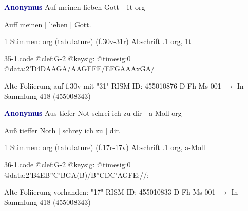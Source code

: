 \documentclass[twocolumn]{book}
\begin{document}
\newline \par \vspace{7pt} \textcolor{darkblue}{\textbf{Anonymus  }}
\newline Auf meinen lieben Gott - 1t
\newline org
\newline \begin{itshape}[f.30v, at left:] Auff meinen | lieben | Gott.\end{itshape} 
\newline \textcolor{darkblue}{}  1 Stimmen: org (tabulature)  (f.30v-31r)
\newline Abschrift
.1  org, 1t  
\begin{filecontents*}{35-1.code}
@clef:G-2
@keysig:
@timesig:0
@data:2'D4DAAGA/AAGFFE/EFGAAAxGA/
\end{filecontents*}
\newline
%
\newline Alte Foliierung auf f.30v mit "31"
\newline RISM-ID: 455010876
\newline D-Fh  Ms 001
\newline $\rightarrow$ In Sammlung 418 (455008343)
      
\newline \par \vspace{7pt} \textcolor{darkblue}{\textbf{Anonymus  }}
\newline Aus tiefer Not schrei ich zu dir - a-Moll
\newline org
\newline \begin{itshape}[f.17r, at left:] Auß tieffer Noth | schreÿ ich zu | dir.\end{itshape} 
\newline \textcolor{darkblue}{}  1 Stimmen: org (tabulature)  (f.17r-17v)
\newline Abschrift
.1  org, a-Moll  
\begin{filecontents*}{36-1.code}
@clef:G-2
@keysig:
@timesig:0
@data:2'B4EB''C'BGA(B)/B''CDC'AGFE://:
\end{filecontents*}
\newline
%
\newline Alte Foliierung vorhanden: "17"
\newline RISM-ID: 455010833
\newline D-Fh  Ms 001
\newline $\rightarrow$ In Sammlung 418 (455008343)
      
\end{document}
